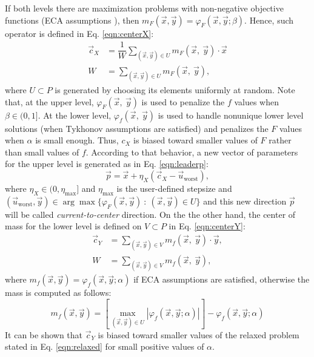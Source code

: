 \documentclass[conference]{IEEEtran}
\theoremstyle{definition}
\begin{document}
If both levels there are maximization problems with non-negative objective functions
(ECA assumptions \cite{Mejia2018}), then $m_F(\vec{x}, \vec{y}) = \varphi_F (\vec{x}, \vec{y}; \beta)$.
Hence, such operator is defined in Eq. \ref{eqn:centerX}:
% 
\begin{align}
    \label{eqn:centerX}
    \vec{c}_X &= \dfrac{1}{W} \sum_{(\vec{x}, \vec{y})\in U} m_F(\vec{x},\ \vec{y}) \cdot \vec{x}\\
            W &= \sum_{(\vec{x}, \vec{y})\in U} m_F(\vec{x},\ \vec{y}), \nonumber
\end{align}
% 
where $U \subset P$ is generated by choosing its elements uniformly at random.
Note that, at the upper level, $\varphi_F (\vec{x},\ \vec{y})$ is used to penalize
the $f$ values when $\beta\in (0, 1]$. At the lower level, $\varphi_f (\vec{x},\ \vec{y})$
is used to handle nonunique lower level solutions (when Tykhonov assumptions are 
satisfied) and penalizes the $F$ values when $\alpha$ is small enough. Thus, $c_X$
is biased toward smaller values of $F$ rather than small values of $f$. According
to that behavior, a new vector of parameters for the upper level is generated as
in Eq. \ref{eqn:leaderp}:
% 
\begin{equation}
    \vec{p} = \vec{x} + \eta_{X} (\vec{c}_X - \vec{u}_{\text{worst}}),
    \label{eqn:leaderp}
\end{equation}
% 
where $\eta_{X} \in (0, \eta_{\max}]$ and $\eta_{\max}$ is the user-defined stepsize and  
$
    (\vec{u}_{\text{worst}}, \vec{y}) \in \arg \max \{\varphi_F(\vec{x}, \vec{y} )  \ : \ (\vec{x}, \vec{y}) \in U \} 
$ %
% 
and this new direction $\vec{p}$ will be called \textit{current-to-center} direction. %
On the the other hand, the center of mass for the lower level is defined on
$V \subset P$ in Eq. \ref{eqn:centerY}:
% 
\begin{align}
    \label{eqn:centerY}
    \vec{c}_Y &= \sum_{(\vec{x}, \vec{y})\in V} m_f(\vec{x},\ \vec{y}) \cdot \vec{y},\\
         W &= \sum_{(\vec{x}, \vec{y})\in V} m_f(\vec{x},\ \vec{y}) , \nonumber
\end{align}
% 
where $m_f(\vec{x}, \vec{y}) = \varphi_f(\vec{x}, \vec{y}; \alpha )$ if ECA assumptions
are satisfied, otherwise the mass is computed as follows:
% 
\[
    m_f(\vec{x}, \vec{y}) =
        \left[ \max_{(\vec{x}, \vec{y})\in U} |\varphi_f (\vec{x}, \vec{y}; \alpha)| \right]
        - \varphi_f (\vec{x}, \vec{y}; \alpha)
\]
% 
It can be shown that $\vec{c}_Y$ is biased toward smaller values of the relaxed
problem stated in Eq. \ref{eqn:relaxed} for small positive values of $\alpha$.
\end{document}
